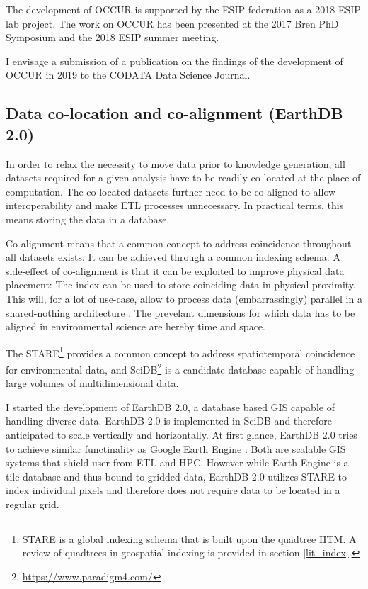 \documentclass[letterpaper, parskip=half]{scrartcl}
\begin{document}
The development of \gls{OCCUR} is supported by the \gls{ESIP} federation as a 2018 \gls{ESIP} lab project. The work on \gls{OCCUR} has been presented at the 2017 Bren PhD Symposium and the 2018 \gls{ESIP} summer meeting.

I envisage a submission of a publication on the findings of the development of OCCUR in 2019 to the CODATA Data Science Journal.
% 
\newpage

\subsection{Data co-location and co-alignment (EarthDB 2.0)}
In order to relax the necessity to move data prior to knowledge generation, all datasets required for a given analysis have to be readily co-located at the place of computation. The co-located datasets further need to be co-aligned to allow interoperability \citep{Kuo2017, Rilee2016} and make \gls{ETL} processes unnecessary. In practical terms, this means storing the data in a database.

Co-alignment means that a common concept to address coincidence throughout all datasets exists. 
It can be achieved through a common indexing schema. A side-effect of co-alignment is that it can be exploited to improve physical data placement: The index can be used to store coinciding data in physical proximity. This will, for a lot of use-case, allow to process data (embarrassingly) parallel in a shared-nothing architecture \citep{Kuo2017}.
The prevelant dimensions for which data has to be aligned in environmental science are hereby time and space.
 
The \gls{STARE}\footnote{STARE is a global indexing schema that is built upon the quadtree \gls{HTM}. A review of quadtrees in geospatial indexing is provided in section \ref{lit_index}.} \citep{Kuo2017} provides a common concept to address spatiotemporal coincidence for environmental data, and SciDB\footnote{\url{https://www.paradigm4.com/}} is a candidate database capable of handling large volumes of multidimensional data.

I started the development of EarthDB 2.0, a database based \gls{GIS} capable of handling diverse data. 
EarthDB 2.0 is implemented in SciDB and therefore anticipated to scale vertically and horizontally.
At first glance, EarthDB 2.0 tries to achieve similar functinality as Google Earth Engine \citep{Gorelick2017}: Both are scalable \gls{GIS} systems that shield user from \gls{ETL} and \gls{HPC}. However while Earth Engine is a tile database and thus bound to gridded data, EarthDB 2.0 utilizes \gls{STARE} to index individual pixels and therefore does not require data to be located in a regular grid. 
\end{document}
